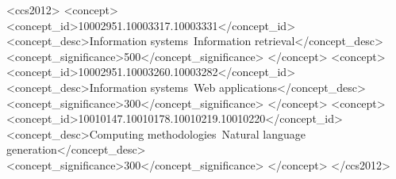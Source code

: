 \begin{CCSXML}
<ccs2012>
 <concept>
  <concept_id>10002951.10003317.10003331</concept_id>
  <concept_desc>Information systems~Information retrieval</concept_desc>
  <concept_significance>500</concept_significance>
 </concept>
 <concept>
  <concept_id>10002951.10003260.10003282</concept_id>
  <concept_desc>Information systems~Web applications</concept_desc>
  <concept_significance>300</concept_significance>
 </concept>
 <concept>
  <concept_id>10010147.10010178.10010219.10010220</concept_id>
  <concept_desc>Computing methodologies~Natural language generation</concept_desc>
  <concept_significance>300</concept_significance>
 </concept>
</ccs2012>
\end{CCSXML}



